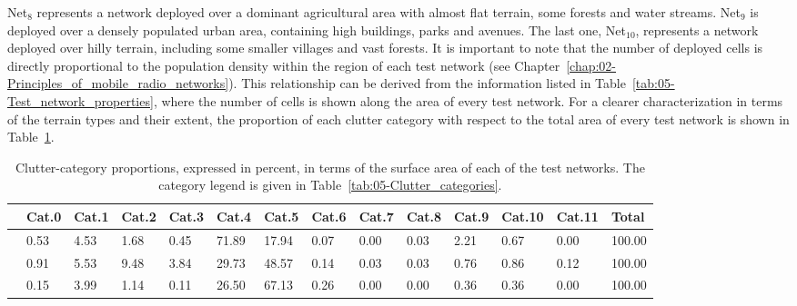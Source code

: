 Net$_{8}$ represents a network deployed over a dominant agricultural
area with almost flat terrain, some forests and water streams. Net$_{9}$
is deployed over a densely populated urban area, containing high buildings,
parks and avenues. The last one, Net$_{10}$, represents a network
deployed over hilly terrain, including some smaller villages and vast
forests. It is important to note that the number of deployed cells
is directly proportional to the population density within the region
of each test network (see Chapter~\ref{chap:02-Principles_of_mobile_radio_networks}).
This relationship can be derived from the information listed in Table~\ref{tab:05-Test_network_properties},
where the number of cells is shown along the area of every test network.
For a clearer characterization in terms of the terrain types and their
extent, the proportion of each clutter category with respect to the
total area of every test network is shown in Table~\ref{tab:05-Proportion_of_clutter_for_test_networks}.

\begin{table}
\centering

\caption{Clutter-category proportions, expressed in percent, in terms of the
surface area of each of the test networks. The category legend is
given in Table~\ref{tab:05-Clutter_categories}. \label{tab:05-Proportion_of_clutter_for_test_networks}}


{\scriptsize{}}%
\begin{tabular}{>{\centering}p{0.4cm}>{\centering}p{0.7cm}>{\centering}p{0.7cm}>{\centering}p{0.7cm}>{\centering}p{0.7cm}>{\centering}p{0.7cm}>{\centering}p{0.7cm}>{\centering}p{0.7cm}>{\centering}p{0.7cm}>{\centering}p{0.7cm}>{\centering}p{0.7cm}>{\centering}p{0.7cm}>{\centering}p{0.7cm}>{\centering}p{0.6cm}}
\cline{2-14} 
 & {\scriptsize{Cat.0}} & {\scriptsize{Cat.1}} & {\scriptsize{Cat.2}} & {\scriptsize{Cat.3}} & {\scriptsize{Cat.4}} & {\scriptsize{Cat.5}} & {\scriptsize{Cat.6}} & {\scriptsize{Cat.7}} & {\scriptsize{Cat.8}} & {\scriptsize{Cat.9}} & {\scriptsize{Cat.10}} & {\scriptsize{Cat.11}} & {\scriptsize{Total}}\tabularnewline
\hline 
{\scriptsize{Net$_{8}$ }} & {\scriptsize{0.53}} & {\scriptsize{4.53}} & {\scriptsize{1.68}} & {\scriptsize{0.45}} & {\scriptsize{71.89}} & {\scriptsize{17.94}} & {\scriptsize{0.07}} & {\scriptsize{0.00}} & {\scriptsize{0.03}} & {\scriptsize{2.21}} & {\scriptsize{0.67}} & {\scriptsize{0.00}} & {\scriptsize{100.00}}\tabularnewline
{\scriptsize{Net$_{9}$ }} & {\scriptsize{0.91}} & {\scriptsize{5.53}} & {\scriptsize{9.48}} & {\scriptsize{3.84}} & {\scriptsize{29.73}} & {\scriptsize{48.57}} & {\scriptsize{0.14}} & {\scriptsize{0.03}} & {\scriptsize{0.03}} & {\scriptsize{0.76}} & {\scriptsize{0.86}} & {\scriptsize{0.12}} & {\scriptsize{100.00}}\tabularnewline
{\scriptsize{Net$_{10}$ }} & {\scriptsize{0.15}} & {\scriptsize{3.99}} & {\scriptsize{1.14}} & {\scriptsize{0.11}} & {\scriptsize{26.50}} & {\scriptsize{67.13}} & {\scriptsize{0.26}} & {\scriptsize{0.00}} & {\scriptsize{0.00}} & {\scriptsize{0.36}} & {\scriptsize{0.36}} & {\scriptsize{0.00}} & {\scriptsize{100.00}}\tabularnewline
\hline 
\end{tabular}
\end{table}


